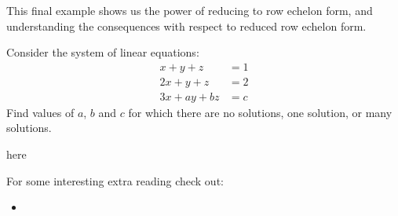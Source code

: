 \documentclass{ximera}
\begin{document}
This final example shows us the power of reducing to row echelon form, and understanding the consequences with respect to reduced row echelon form.

\begin{example}
  Consider the system of linear equations:
  \begin{align*}
    x+y+z &=  1\\
    2x+y+z &=  2\\
    3x+ay+bz &= c
  \end{align*}
  Find values of $a$, $b$ and $c$ for which there are no solutions,
  one solution, or many solutions.
  \begin{explanation}
    here
  \end{explanation}
\end{example}







For some interesting extra reading check out:
\begin{itemize}
\item {}
\end{itemize}
\end{document}
